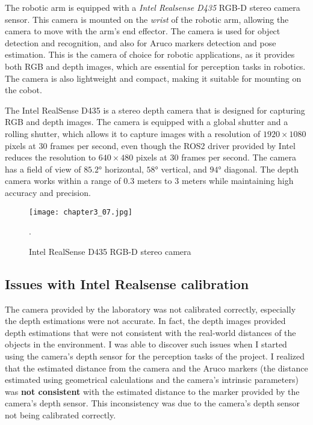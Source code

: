 The robotic arm is equipped with a \textit{Intel Realsense D435} RGB-D stereo camera sensor.
This camera is mounted on the \textit{wrist} of the robotic arm, allowing the camera to move with the arm's end effector.
The camera is used for object detection and recognition, and also for Aruco markers detection and pose estimation.
This is the camera of choice for robotic applications, as it provides both RGB and depth images, which are essential
for perception tasks in robotics. The camera is also lightweight and compact, making it suitable for mounting on the cobot.

The Intel RealSense D435 is a stereo depth camera that is designed for capturing RGB and depth images.
The camera is equipped with a global shutter and a rolling shutter, which allows it to capture images with a resolution
of $1920\times1080$ pixels at $30$ frames per second, even though the ROS2 driver provided by Intel reduces the resolution
to $640\times480$ pixels at $30$ frames per second. The camera has a field of view of $85.2$° horizontal, $58$° vertical,
and $94$° diagonal. The depth camera works within a range of $0.3$ meters to $3$ meters while maintaining 
high accuracy and precision.

\begin{figure}[t]
    \centering
    \texttt{[image: chapter3\_07.jpg]}
    \captionsetup{width=1\linewidth}
    \caption{Intel RealSense D435 RGB-D stereo camera}.
    \label{fig:c3_img07}
\end{figure}

\subsection{Issues with Intel Realsense calibration}

The camera provided by the laboratory was not calibrated correctly, especially the depth estimations were not accurate.
In fact, the depth images provided depth estimations that were not consistent with the real-world distances of the objects
in the environment. I was able to discover such issues when I started using the camera's depth sensor for the perception
tasks of the project. I realized that the estimated distance from the camera and the Aruco markers (the distance estimated
using geometrical calculations and the camera's intrinsic parameters) was \textbf{not consistent} with the estimated distance
to the marker provided by the camera's depth sensor. This inconsistency was due to the camera's depth sensor not being
calibrated correctly.


